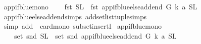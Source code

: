 \begin{isabellebody}
%
\isadelimproof
%
\endisadelimproof
%
\isadelimdocument
%
\endisadelimdocument
%
\isatagdocument
%
\isamarkuptrue%
%
\endisatagdocument
{\isafolddocument}%
%
\isadelimdocument
%
\endisadelimdocument
{}\isamarkupfalse%
\ app{\isacharunderscore}{\kern0pt}if{\isacharunderscore}{\kern0pt}blue{\isacharunderscore}{\kern0pt}mono{\isacharcolon}{\kern0pt}\isanewline
\ \ \ \ {\isachardoublequoteopen}{\isacharparenleft}{\kern0pt}fst\ {\isacharparenleft}{\kern0pt}S{\isacharcomma}{\kern0pt}L{\isacharparenright}{\kern0pt}{\isacharparenright}{\kern0pt}\ {\isasymsubseteq}\ {\isacharparenleft}{\kern0pt}fst\ {\isacharparenleft}{\kern0pt}app{\isacharunderscore}{\kern0pt}if{\isacharunderscore}{\kern0pt}blue{\isacharunderscore}{\kern0pt}else{\isacharunderscore}{\kern0pt}add{\isacharunderscore}{\kern0pt}end\ G\ k\ a\ {\isacharparenleft}{\kern0pt}S{\isacharcomma}{\kern0pt}L{\isacharparenright}{\kern0pt}{\isacharparenright}{\kern0pt}{\isacharparenright}{\kern0pt}{\isachardoublequoteclose}\isanewline
%
\isadelimproof
\ \ %
\endisadelimproof
%
\isatagproof
{}\isamarkupfalse%
\ app{\isacharunderscore}{\kern0pt}if{\isacharunderscore}{\kern0pt}blue{\isacharunderscore}{\kern0pt}else{\isacharunderscore}{\kern0pt}add{\isacharunderscore}{\kern0pt}end{\isachardot}{\kern0pt}simps\ add{\isacharunderscore}{\kern0pt}set{\isacharunderscore}{\kern0pt}list{\isacharunderscore}{\kern0pt}tuple{\isachardot}{\kern0pt}simps\isanewline
\ \ \isamarkupfalse%
\ {\isacharparenleft}{\kern0pt}simp\ add{\isacharcolon}{\kern0pt}\ \ card{\isacharunderscore}{\kern0pt}mono\ subset{\isacharunderscore}{\kern0pt}insertI{\isacharparenright}{\kern0pt}%
\endisatagproof
{\isafoldproof}%
%
\isadelimproof
\isanewline
%
\endisadelimproof
\isanewline
{}\isamarkupfalse%
\ app{\isacharunderscore}{\kern0pt}if{\isacharunderscore}{\kern0pt}blue{\isacharunderscore}{\kern0pt}mono{}{\isacharcolon}{\kern0pt}\isanewline
\ \ \ \ {\isachardoublequoteopen}set\ {\isacharparenleft}{\kern0pt}snd\ {\isacharparenleft}{\kern0pt}S{\isacharcomma}{\kern0pt}L{\isacharparenright}{\kern0pt}{\isacharparenright}{\kern0pt}\ {\isasymsubseteq}\ set\ {\isacharparenleft}{\kern0pt}snd\ {\isacharparenleft}{\kern0pt}app{\isacharunderscore}{\kern0pt}if{\isacharunderscore}{\kern0pt}blue{\isacharunderscore}{\kern0pt}else{\isacharunderscore}{\kern0pt}add{\isacharunderscore}{\kern0pt}end\ G\ k\ a\ {\isacharparenleft}{\kern0pt}S{\isacharcomma}{\kern0pt}L{\isacharparenright}{\kern0pt}\ {\isacharparenright}{\kern0pt}{\isacharparenright}{\kern0pt}{\isachardoublequoteclose}\isanewline

\end{isabellebody}
